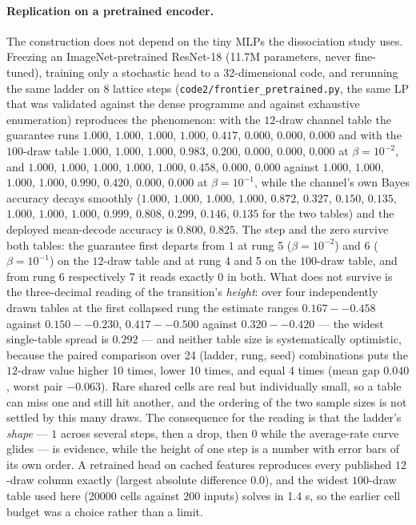 \documentclass[11pt]{article}
\begin{document}
\paragraph{Replication on a pretrained encoder.}
The construction does not depend on the tiny MLPs the dissociation study uses. Freezing an
ImageNet-pretrained ResNet-18 (11.7M parameters, never fine-tuned), training only
a stochastic head to a 32-dimensional code, and rerunning the same ladder on 8 lattice steps
(\texttt{code2/frontier\_pretrained.py}, the same LP that was validated against the dense programme
and against exhaustive enumeration) reproduces the phenomenon: with the $12$-draw channel table the
guarantee runs $1.000$, $1.000$, $1.000$, $1.000$, $0.417$, $0.000$, $0.000$, $0.000$ and with the $100$-draw table $1.000$, $1.000$, $1.000$, $0.983$, $0.200$, $0.000$, $0.000$, $0.000$ at $\beta=10^{-2}$, and
$1.000$, $1.000$, $1.000$, $1.000$, $1.000$, $0.458$, $0.000$, $0.000$ against $1.000$, $1.000$, $1.000$, $1.000$, $0.990$, $0.420$, $0.000$, $0.000$ at $\beta=10^{-1}$, while the channel's own Bayes accuracy decays
smoothly ($1.000$, $1.000$, $1.000$, $1.000$, $0.872$, $0.327$, $0.150$, $0.135$, $1.000$, $1.000$, $1.000$, $0.999$, $0.808$, $0.299$, $0.146$, $0.135$ for the two tables) and the deployed mean-decode accuracy is
$0.800$, $0.825$. The step and the zero survive both tables: the guarantee
first departs from $1$ at rung 5 ($\beta=10^{-2}$) and 6 ($\beta=10^{-1}$) on the
$12$-draw table and at rung 4 and 5 on the $100$-draw table, and from rung 6
respectively 7 it reads exactly $0$ in both. What
does not survive is the three-decimal reading of the transition's \emph{height}: over four
independently drawn tables at the first collapsed rung the estimate ranges
$0.167--0.458$ against $0.150--0.230$, $0.417--0.500$ against $0.320--0.420$ --- the widest single-table spread is $0.292$ --- and neither table size is systematically
optimistic, because the paired comparison over 24 (ladder, rung, seed) combinations puts the
$12$-draw value higher 10 times, lower 10 times, and equal 4 times (mean gap
$0.040$, worst pair $-0.063$). Rare shared cells are real but individually small, so a table
can miss one and still hit another, and the ordering of the two sample sizes is not settled by this
many draws. The consequence for the reading is that the ladder's \emph{shape} --- $1$ across several
steps, then a drop, then $0$ while the average-rate curve glides --- is evidence, while the height of
one step is a number with error bars of its own order. A retrained head on cached features reproduces
every published $12$-draw column exactly (largest absolute difference $0.0$), and the widest
$100$-draw table used here (20000 cells against $200$ inputs) solves in 1.4 s, so the earlier
cell budget was a choice rather than a limit.
\end{document}
